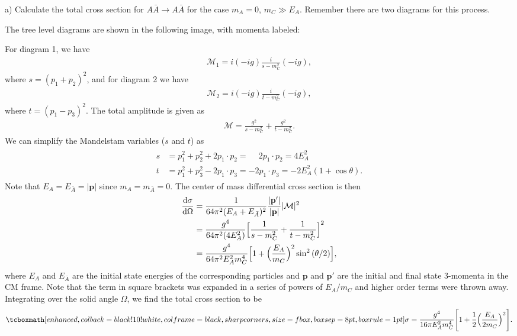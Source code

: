 \def\duedate{11/29/22}
\def\HWnum{4}

\usepackage[]{slashed}


    

a) Calculate the total cross section for $A \bar{A} \rightarrow A \bar{A}$ for the case $m_{A} = 0$, $m_{C} \gg E_{A}$.
Remember there are two diagrams for this process.

The tree level diagrams are shown in the following image, with momenta labeled:

For diagram 1, we have
\begin{eqnarray}
    \label{eq:amp1}
    \mathcal{M}_{1} = i(-ig)\frac{i}{s - m_{C}^2}(-ig) 
,\end{eqnarray}
where $s = (p_1 + p_2)^2$,
and for diagram 2 we have
\begin{eqnarray}
    \label{eq:amp2}
    \mathcal{M}_{2} = i(-ig)\frac{i}{t - m_{C}^2}(-ig) 
,\end{eqnarray}
where $t = (p_1 - p_3)^2$.
The total amplitude is given as
\begin{eqnarray}
    \label{eq:squared-amp}
    \mathcal{M} = \frac{g^{2}}{s - m_{C}^2} + \frac{g^{2}}{t - m_{C}^2}
.\end{eqnarray}
We can simplify the Mandelstam variables ($s$ and $t$) as 
\begin{eqnarray}
    \label{eq:mand-vars}
    \begin{aligned}    
        s &= p_1^2 + p_2^2 + 2 p_1 \cdot p_2 = \phantom{-} 2 p_1 \cdot p_2 = 4 E_{A}^2 \\
        t &= p_1^2 + p_3^2 - 2 p_1 \cdot p_3 = -2 p_1 \cdot p_3 = -2 E_{A}^2 (1 + \cos{\theta})
    .\end{aligned}
\end{eqnarray}
Note that $E_{A} = E_{\bar{A}} = | \mathbf{p} |$ since $m_{A} = m_{\bar{A}} = 0$.
The center of mass differential cross section is then
\begin{align}
    \label{eq:dxsec-CM}
    \dv{\sigma}{\Omega} &= \frac{1}{64 \pi^2 (E_{A} + E_{\bar{A}})^2} \frac{| \mathbf{p}' |}{| \mathbf{p} |} | \mathcal{M} |^2 \\
                        &= \frac{g^{4}}{64 \pi^2 (4 E_{A}^2)} \Big[ \frac{1}{s - m_{C}^2} + \frac{1}{t - m_{C}^2} \Big]^2 \\
                        &= \frac{g^{4}}{64 \pi ^2 E_{A}^2 m_{C}^{4}} \Big[ 1 + \Big( \frac{E_{A}}{m_{C}} \Big)^2 \sin^2{(\theta/2)} \Big]
,\end{align}
where $E_{A}$ and $E_{\bar{A}}$ are the initial state energies of the corresponding particles and $\mathbf{p}$ and $\mathbf{p}'$ are the initial and final state 3-momenta in the CM frame.
Note that the term in square brackets was expanded in a series of powers of $E_{A}/m_{C}$ and higher order terms were thrown away.
Integrating over the solid angle $\Omega$, we find the total cross section to be
\begin{eqnarray}
    \label{eq:tot-xsec-AAbar}
    \eqbox{
        \sigma = \frac{g^{4}}{16 \pi E_{A}^2 m_{C}^{4}} \Bigg[ 1 + \frac{1}{2} \Big( \frac{E_{A}}{2 m_{C}} \Big)^2 \Bigg]
}
.\end{eqnarray}


